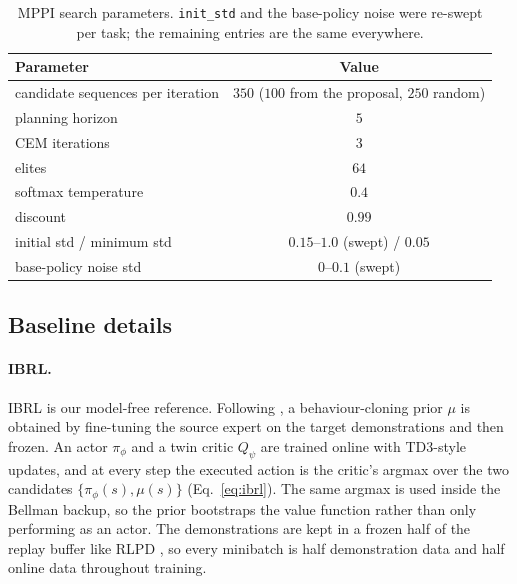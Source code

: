 \documentclass{article} %
\begin{document}
\begin{table}[h]
\centering
\caption{MPPI search parameters. \texttt{init\_std} and the base-policy noise
were re-swept per task; the remaining entries are the same everywhere.}
\label{tab:app-planner}
\small
\begin{tabular}{lc}
\toprule
Parameter & Value \\
\midrule
candidate sequences per iteration & $350$ ($100$ from the proposal, $250$ random) \\
planning horizon & $5$ \\
CEM iterations & $3$ \\
elites & $64$ \\
softmax temperature & $0.4$ \\
discount & $0.99$ \\
initial std / minimum std & $0.15$--$1.0$ (swept) / $0.05$ \\
base-policy noise std & $0$--$0.1$ (swept) \\
\bottomrule
\end{tabular}
\end{table}



\subsection{Baseline details}
\label{app:baselines}

\paragraph{IBRL.}
IBRL is our model-free reference. Following \citet{hu2023imitation}, a behaviour-cloning prior $\mu$ is obtained by fine-tuning the source expert on the target demonstrations and then frozen. An actor $\pi_\phi$ and a twin critic $Q_\psi$ are trained online with TD3-style updates, and at every step the executed action is the critic's argmax over the two candidates $\{\pi_\phi(s), \mu(s)\}$ (Eq.~\ref{eq:ibrl}). The same argmax is used inside the Bellman backup, so the prior bootstraps the value function rather than only performing as an actor. The demonstrations are kept in a frozen half of the replay buffer like RLPD \cite{ball2023efficient}, so every minibatch is half demonstration data and half online data throughout training.
\end{document}
